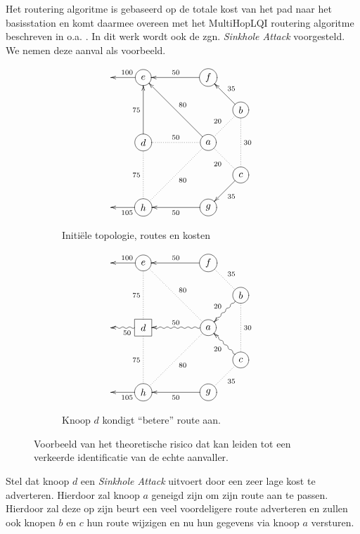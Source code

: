 Het routering algoritme is gebaseerd op de totale kost van het pad naar het
basisstation en komt daarmee overeen met het MultiHopLQI routering algoritme
beschreven in o.a. \cite{krontiris2008launching}. In dit werk wordt ook de zgn.
\emph{Sinkhole Attack} voorgesteld. We nemen deze aanval als voorbeeld.

\begin{figure}
\centering
\begin{subfigure}{.49\textwidth}
  \centering
\[ \entrymodifiers={-=++[o][F]}
 \xymatrix@!=0.75pc {
*{} & e \ar@{->}[l]_{100} & *{} & f \ar@{->}[ll]_{50}   & *{} \\
*{} & *{} & *{} &  *{} & b \ar@{->}[lu]_{35} \ar@{.}[ld]_{20} \ar@{.}[dd]^{30}  \\
*{} & d \ar@{->}[uu]^{75} \ar@{.}[dd]_{75}  & *{} &    a \ar@{->}[lluu]_{80} \ar@{.}[lldd]^{80} \ar@{.}[ll]_{50} & *{} \\
*{} & *{} & *{} &  *{} & c \ar@{.}[lu]^{20} \ar@{->}[ld]^{35} \\
*{} & h \ar@{->}[l]^{105}  & *{} &  g \ar@{->}[ll]^{50}  & *{} \\
  }
\]
  \caption{Initi\"ele topologie, routes en kosten}
  \label{fig:sinkhole-ripple-1}
\end{subfigure}
\begin{subfigure}{.49\textwidth}
  \centering
\[ \entrymodifiers={-=++[o][F]}
 \xymatrix@!=0.75pc {
*{} & e \ar@{->}[l]_{100} & *{} & f \ar@{->}[ll]_{50}   & *{} \\
*{} & *{} & *{} &  *{} & b \ar@{.}[lu]_{35} \ar@{~>}[ld]_{20} \ar@{.}[dd]^{30}  \\
*{} & *-=++[F]{d} \ar@{~>}[l]^{50} \ar@{.}[uu]^{75} \ar@{.}[dd]_{75}  & *{} &    a \ar@{.}[lluu]_{80} \ar@{.}[lldd]^{80} \ar@{~>}[ll]_{50} & *{} \\
*{} & *{} & *{} &  *{} & c \ar@{~>}[lu]^{20} \ar@{.}[ld]^{35} \\
*{} & h \ar@{->}[l]^{105}  & *{} &  g \ar@{->}[ll]^{50}  & *{} \\
  }
\]
  \caption{Knoop $d$ kondigt ``betere'' route aan.}
  \label{fig:sinkhole-ripple-2}
\end{subfigure}
\caption{Voorbeeld van het theoretische risico dat kan leiden tot een verkeerde
identificatie van de echte aanvaller.}
\label{fig:sinkhole-ripple}
\end{figure}

Stel dat knoop $d$ een \emph{Sinkhole Attack} uitvoert door een zeer lage kost
te adverteren. Hierdoor zal knoop $a$ geneigd zijn om zijn route aan te passen.
Hierdoor zal deze op zijn beurt een veel voordeligere route adverteren en
zullen ook knopen $b$ en $c$ hun route wijzigen en nu hun gegevens via knoop
$a$ versturen.

